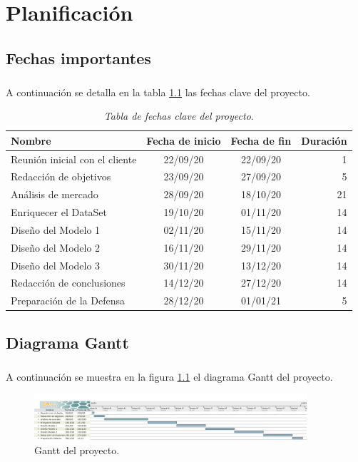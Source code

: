 \chapter{Planificación}
\label{chapter:planificación}


\section{Fechas importantes}

\paragraph{}
A continuación se detalla en la tabla \ref{table:gant_tabla} las fechas clave del proyecto.

\begin{table}[h!]
	\centering{}
	\begin{tabular}{ l | c | c | r }
		\hline
		Nombre & Fecha de inicio & Fecha de fin & Duración \\
		\hline
		\hline
		Reunión inicial con el cliente & 22/09/20 & 22/09/20 & 1  \\
		\hline
		Redacción de objetivos & 23/09/20 & 27/09/20 & 5  \\
		\hline
		Análisis de mercado & 28/09/20 & 18/10/20 & 21  \\
		\hline
		Enriquecer el DataSet & 19/10/20 & 01/11/20 & 14 \\
		\hline
		Diseño del Modelo 1 & 02/11/20 & 15/11/20 & 14  \\
		\hline
		Diseño del Modelo 2 & 16/11/20 & 29/11/20 & 14  \\
		\hline
		Diseño del Modelo 3 & 30/11/20 & 13/12/20 & 14  \\
		\hline
		Redacción de conclusiones & 14/12/20 & 27/12/20 & 14  \\
		\hline
		Preparación de la Defensa & 28/12/20 & 01/01/21 & 5  \\
		\hline
	\end{tabular}
	\caption{\textit{Tabla de fechas clave del proyecto}.}
	\label{table:gant_tabla}
\end{table}

\section{Diagrama Gantt}

\paragraph{}

A continuación se muestra en la figura \ref{fig:gant} el diagrama Gantt del proyecto.

\begin{figure}[h!]
	\centering
	\includegraphics[width=0.9\textwidth]{figs/gant.png}
	\caption{Gantt del proyecto.}
	\label{fig:gant}
\end{figure}
